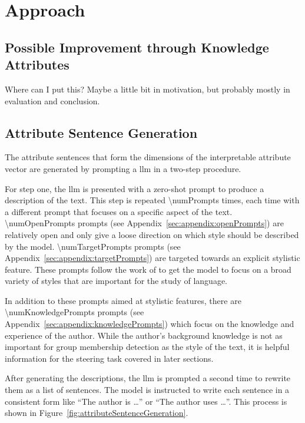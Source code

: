 \chapter{Approach}
\label{sec:approach}

\section{Possible Improvement through Knowledge Attributes}
\label{sec:approach:knowledgeAttributes}
Where can I put this? Maybe a little bit in motivation, but probably mostly in evaluation and conclusion.


\section{Attribute Sentence Generation}
\label{sec:approach:attributeSentenceGeneration}

The attribute sentences that form the dimensions of the interpretable attribute vector are generated by prompting a \acf{llm} in a two-step procedure.

For step one, the \ac{llm} is presented with a zero-shot prompt to produce a description of the text. This step is repeated \num{\numPrompts} times, each time with a different prompt that focuses on a specific aspect of the text. \num{\numOpenPrompts} prompts (see Appendix~\ref{sec:appendix:openPrompts}) are relatively open and only give a loose direction on which style should be described by the model. \num{\numTargetPrompts} prompts (see Appendix~\ref{sec:appendix:targetPrompts}) are targeted towards an explicit stylistic feature. These prompts follow the work of \citet{patelLearningInterpretableStyle2023,tausczikPsychologicalMeaningWords2010} to get the model to focus on a broad variety of styles that are important for the study of language.

In addition to these prompts aimed at stylistic features, there are \num{\numKnowledgePrompts} prompts (see Appendix~\ref{sec:appendix:knowledgePrompts}) which focus on the knowledge and experience of the author. While the author's background knowledge is not as important for group membership detection as the style of the text, it is helpful information for the steering task covered in later sections.

After generating the descriptions, the \ac{llm} is prompted a second time to rewrite them as a list of sentences. The model is instructed to write each sentence in a consistent form like \enquote{The author is \ldots} or \enquote{The author uses \ldots}. This process is shown in Figure~\ref{fig:attributeSentenceGeneration}.

